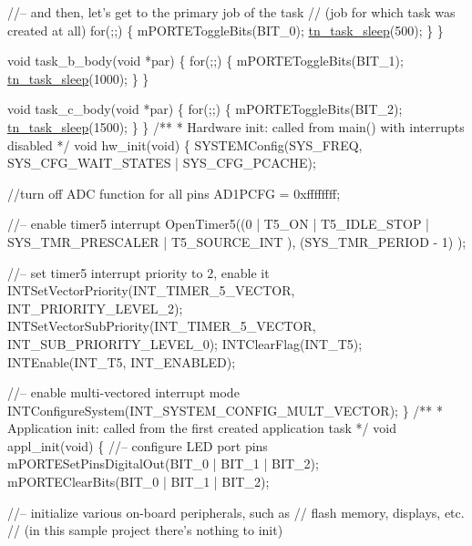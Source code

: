 \begin{DoxyCodeInclude}
   \textcolor{comment}{//-- and then, let's get to the primary job of the task}
   \textcolor{comment}{//   (job for which task was created at all)}
   \textcolor{keywordflow}{for}(;;)
   \{
      mPORTEToggleBits(BIT\_0);
      \hyperlink{tn__tasks_8h_ad3708ae3400f11b98747ad4a1cad88fa}{tn\_task\_sleep}(500);
   \}
\}

\textcolor{keywordtype}{void} task\_b\_body(\textcolor{keywordtype}{void} *par)
\{
   \textcolor{keywordflow}{for}(;;)
   \{
      mPORTEToggleBits(BIT\_1);
      \hyperlink{tn__tasks_8h_ad3708ae3400f11b98747ad4a1cad88fa}{tn\_task\_sleep}(1000);
   \}
\}

\textcolor{keywordtype}{void} task\_c\_body(\textcolor{keywordtype}{void} *par)
\{
   \textcolor{keywordflow}{for}(;;)
   \{
      mPORTEToggleBits(BIT\_2);
      \hyperlink{tn__tasks_8h_ad3708ae3400f11b98747ad4a1cad88fa}{tn\_task\_sleep}(1500);
   \}
\}
\textcolor{comment}{}
\textcolor{comment}{/**}
\textcolor{comment}{ * Hardware init: called from main() with interrupts disabled}
\textcolor{comment}{ */}
\textcolor{keywordtype}{void} hw\_init(\textcolor{keywordtype}{void})
\{
   SYSTEMConfig(SYS\_FREQ, SYS\_CFG\_WAIT\_STATES | SYS\_CFG\_PCACHE);

   \textcolor{comment}{//turn off ADC function for all pins}
   AD1PCFG = 0xffffffff;

   \textcolor{comment}{//-- enable timer5 interrupt}
   OpenTimer5((0
            | T5\_ON
            | T5\_IDLE\_STOP
            | SYS\_TMR\_PRESCALER
            | T5\_SOURCE\_INT
            ),
         (SYS\_TMR\_PERIOD - 1)
         );

   \textcolor{comment}{//-- set timer5 interrupt priority to 2, enable it}
   INTSetVectorPriority(INT\_TIMER\_5\_VECTOR, INT\_PRIORITY\_LEVEL\_2);
   INTSetVectorSubPriority(INT\_TIMER\_5\_VECTOR, INT\_SUB\_PRIORITY\_LEVEL\_0);
   INTClearFlag(INT\_T5);
   INTEnable(INT\_T5, INT\_ENABLED);

   \textcolor{comment}{//-- enable multi-vectored interrupt mode}
   INTConfigureSystem(INT\_SYSTEM\_CONFIG\_MULT\_VECTOR);
\}
\textcolor{comment}{}
\textcolor{comment}{/**}
\textcolor{comment}{ * Application init: called from the first created application task}
\textcolor{comment}{ */}
\textcolor{keywordtype}{void} appl\_init(\textcolor{keywordtype}{void})
\{
   \textcolor{comment}{//-- configure LED port pins}
   mPORTESetPinsDigitalOut(BIT\_0 | BIT\_1 | BIT\_2);
   mPORTEClearBits(BIT\_0 | BIT\_1 | BIT\_2);

   \textcolor{comment}{//-- initialize various on-board peripherals, such as}
   \textcolor{comment}{//   flash memory, displays, etc.}
   \textcolor{comment}{//   (in this sample project there's nothing to init)}


\end{DoxyCodeInclude}
